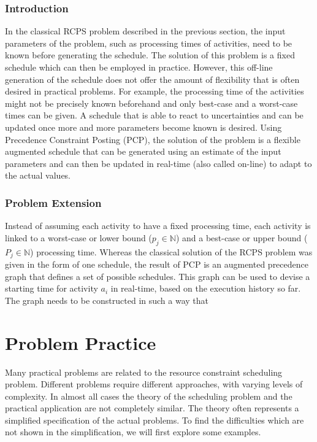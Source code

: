 \documentclass{article}
\begin{document}
\subsubsection{Introduction}
In the classical RCPS problem described in the previous section, the input parameters of the problem, such as processing times of activities, need to be known before generating the schedule. The solution of this problem is a fixed schedule which can then be employed in practice. However, this off-line generation of the schedule does not offer the amount of flexibility that is often desired in practical problems. For example, the processing time of the activities might not be precisely known beforehand and only best-case and a worst-case times can be given. A schedule that is able to react to uncertainties and can be updated once more and more parameters become known is desired. Using Precedence Constraint Posting (PCP), the solution of the problem is a flexible augmented schedule that can be generated using an estimate of the input parameters and can then be updated in real-time (also called on-line) to adapt to the actual values.

\subsubsection{Problem Extension}
Instead of assuming each activity to have a fixed processing time, each activity is linked to a worst-case or lower bound ($p_{j} \in \mathbb{N}$) and a best-case or upper bound ($P_{j} \in \mathbb{N}$) processing time. Whereas the classical solution of the RCPS problem was given in the form of one schedule, the result of PCP is an augmented precedence graph that defines a set of possible schedules. This graph can be used to devise a starting time for activity $a_i$ in real-time, based on the execution history so far. The graph needs to be constructed in such a way that 

\newpage

\section{Problem Practice}
Many practical problems are related to the resource constraint scheduling problem.
Different problems require different approaches, with varying levels of complexity.
In almost all cases the theory of the scheduling problem and the practical application are not completely similar.
The theory often represents a simplified specification of the actual problems.
To find the difficulties which are not shown in the simplification, we will first explore some examples.
\end{document}
